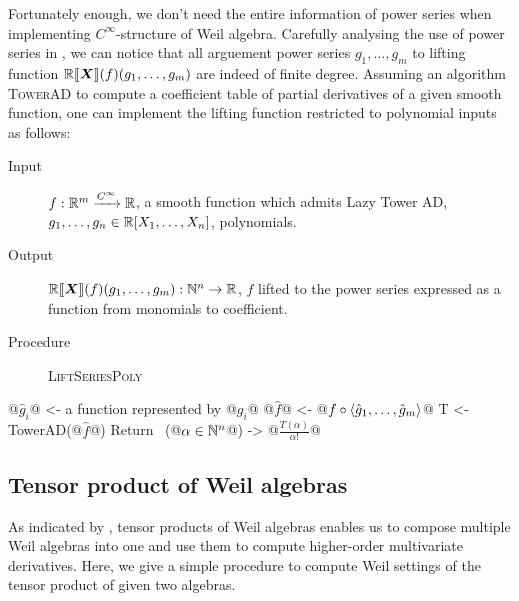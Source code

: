 \documentclass[%
  sigconf,authorversion,screen]{acmart}
\begin{document}
Fortunately enough, we don't need the entire information of power series when implementing $C^\infty$-structure of Weil algebra.
Carefully analysing the use of power series in , we can notice that all arguement power series $g_1, \dots, g_m$ to lifting function $\mathord{\mathbb{R}\llbracket\boldsymbol{X}\rrbracket}(f)(g_1, \dots, g_m)$ are indeed of finite degree.
Assuming an algorithm \textsc{TowerAD} to compute a coefficient table of partial derivatives of a given smooth function, one can implement the lifting function restricted to polynomial inputs as follows:

\begin{algorithm}\label{alg:lift-poly-series}
\hfill\vspace{-.25em}
\begin{description}
  \item[Input]
    $f: \mathbb{R}^m \xrightarrow{C^\infty} \mathbb{R}$, a smooth function which admits Lazy Tower AD,
    $g_1, \dots, g_n \in \mathbb{R}[X_1, \dots, X_n]$, polynomials.
  \item[Output] $\mathord{\mathbb{R}\llbracket\boldsymbol{X}\rrbracket}(f)(g_1, \dots, g_m): \mathbb{N}^n \to \mathbb{R}$, $f$ lifted to the power series expressed as a function from monomials to coefficient.
  \item[Procedure] \textup{\textsc{LiftSeriesPoly}}
\end{description}
\begin{alg}
@$\hat{g}_i$@ <- a function represented by @$g_i$@
@$\hat{f}$@ <- @$f \circ \braket{\hat{g}_1, \dots, \hat{g}_m}$@
T <- TowerAD(@$\hat f$@)
Return \ (@$\alpha \in \mathbb{N}^n$@) -> @$\frac{T(\alpha)}{\alpha!}$@
\end{alg}
\end{algorithm}

\subsection{Tensor product of Weil algebras}
\label{sec:tensor-algorithm}
As indicated by , tensor products of Weil algebras enables us to compose multiple Weil algebras into one and use them to compute higher-order multivariate derivatives.
Here, we give a simple procedure to compute Weil settings of the tensor product of given two algebras.
\end{document}
